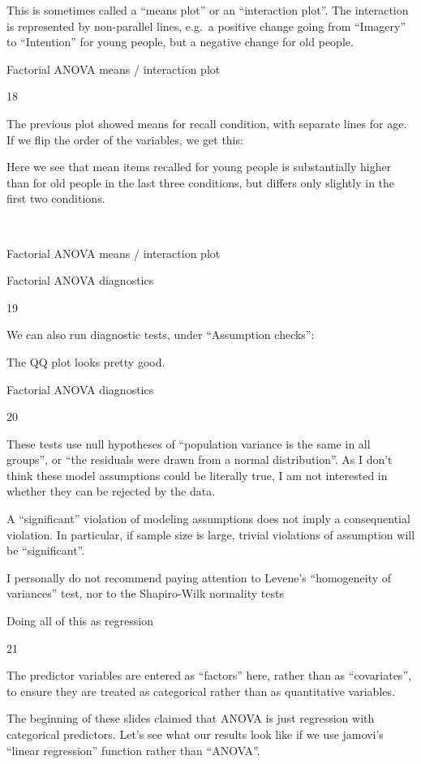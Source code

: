 \documentclass[
  letterpaper,
  DIV=11,
  numbers=noendperiod]{scrreprt}
\begin{document}
This is sometimes called a ``means plot'' or an ``interaction plot''.
The interaction is represented by non-parallel lines, e.g.~a positive
change going from ``Imagery'' to ``Intention'' for young people, but a
negative change for old people.

Factorial ANOVA means / interaction plot

18

The previous plot showed means for recall condition, with separate lines
for age. If we flip the order of the variables, we get this:

Here we see that mean items recalled for young people is substantially
higher than for old people in the last three conditions, but differs
only slightly in the first two conditions.

~~~~~~~~

Factorial ANOVA means / interaction plot

Factorial ANOVA diagnostics

19

We can also run diagnostic tests, under ``Assumption checks'':

The QQ plot looks pretty good.

Factorial ANOVA diagnostics

20

These tests use null hypotheses of ``population variance is the same in
all groups'', or ``the residuals were drawn from a normal
distribution''. As I don't think these model assumptions could be
literally true, I am not interested in whether they can be rejected by
the data.

A ``significant'' violation of modeling assumptions does not imply a
consequential violation. In particular, if sample size is large, trivial
violations of assumption will be ``significant''.

I personally do not recommend paying attention to Levene's ``homogeneity
of variances'' test, nor to the Shapiro-Wilk normality tests

Doing all of this as regression

21

The predictor variables are entered as ``factors'' here, rather than as
``covariates'', to ensure they are treated as categorical rather than as
quantitative variables.

The beginning of these slides claimed that ANOVA is just regression with
categorical predictors. Let's see what our results look like if we use
jamovi's ``linear regression'' function rather than ``ANOVA''.
\end{document}
